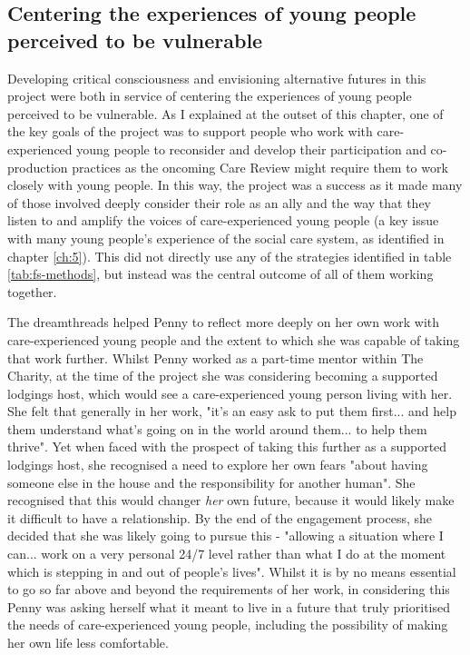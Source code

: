 \subsection{Centering the experiences of young people perceived to be vulnerable}
Developing critical consciousness and envisioning alternative futures in this project were both in service of centering the experiences of young people perceived to be vulnerable. As I explained at the outset of this chapter, one of the key goals of the project was to support people who work with care-experienced young people to reconsider and develop their participation and co-production practices as the oncoming Care Review might require them to work closely with young people. In this way, the project was a success as it made many of those involved deeply consider their role as an ally and the way that they listen to and amplify the voices of care-experienced young people (a key issue with many young people's experience of the social care system, as identified in chapter \ref{ch:5}). This did not directly use any of the strategies identified in table \ref{tab:fs-methods}, but instead was the central outcome of all of them working together. 

The dreamthreads helped Penny to reflect more deeply on her own work with care-experienced young people and the extent to which she was capable of taking that work further. Whilst Penny worked as a part-time mentor within The Charity, at the time of the project she was considering becoming a supported lodgings host, which would see a care-experienced young person living with her. She felt that generally in her work, "it's an easy ask to put them first... and help them understand what's going on in the world around them... to help them thrive". Yet when faced with the prospect of taking this further as a supported lodgings host, she recognised a need to explore her own fears "about having someone else in the house and the responsibility for another human". She recognised that this would changer \textit{her} own future, because it would likely make it difficult to have a relationship. By the end of the engagement process, she decided that she was likely going to pursue this - "allowing a situation where I can... work on a very personal 24/7 level rather than what I do at the moment which is stepping in and out of people's lives". Whilst it is by no means essential to go so far above and beyond the requirements of her work, in considering this Penny was asking herself what it meant to live in a future that truly prioritised the needs of care-experienced young people, including the possibility of making her own life less comfortable.

